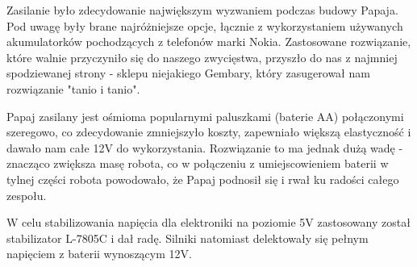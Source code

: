 Zasilanie było zdecydowanie największym wyzwaniem podczas budowy Papaja. Pod uwagę były brane najróżniejsze opcje, łącznie z wykorzystaniem używanych akumulatorków pochodzących z telefonów marki Nokia. Zastosowane rozwiązanie, które walnie przyczyniło się do naszego zwycięstwa, przyszło do nas z najmniej spodziewanej strony - sklepu niejakiego Gembary, który zasugerował nam rozwiązanie "tanio i tanio".

Papaj zasilany jest ośmioma popularnymi paluszkami (baterie AA) połączonymi szeregowo, co zdecydowanie zmniejszyło koszty, zapewniało większą elastyczność i dawało nam całe 12V do wykorzystania. Rozwiązanie to ma jednak dużą wadę - znacząco zwiększa masę robota, co w połączeniu z umiejscowieniem baterii w tylnej części robota powodowało, że Papaj podnosił się i rwał ku radości całego zespołu. 

W celu stabilizowania napięcia dla elektroniki na poziomie 5V zastosowany został stabilizator L-7805C i dał radę.  Silniki natomiast delektowały się pełnym napięciem z baterii wynoszącym 12V.